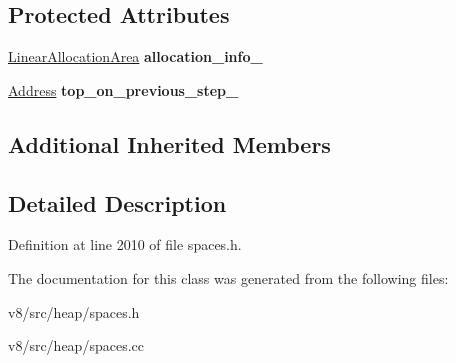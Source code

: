 \subsection*{Protected Attributes}
\begin{DoxyCompactItemize}
\item 
\mbox{\label{classv8_1_1internal_1_1SpaceWithLinearArea_ac31bc82b1905578b337a2cd731419e5f}} 
\mbox{\hyperlink{classv8_1_1internal_1_1LinearAllocationArea}{Linear\+Allocation\+Area}} {\bfseries allocation\+\_\+info\+\_\+}
\item 
\mbox{\label{classv8_1_1internal_1_1SpaceWithLinearArea_a75d5d47dec861087a7869bd6e78ec74e}} 
\mbox{\hyperlink{classuintptr__t}{Address}} {\bfseries top\+\_\+on\+\_\+previous\+\_\+step\+\_\+}
\end{DoxyCompactItemize}
\subsection*{Additional Inherited Members}


\subsection{Detailed Description}


Definition at line 2010 of file spaces.\+h.



The documentation for this class was generated from the following files\+:\begin{DoxyCompactItemize}
\item 
v8/src/heap/spaces.\+h\item 
v8/src/heap/spaces.\+cc\end{DoxyCompactItemize}
